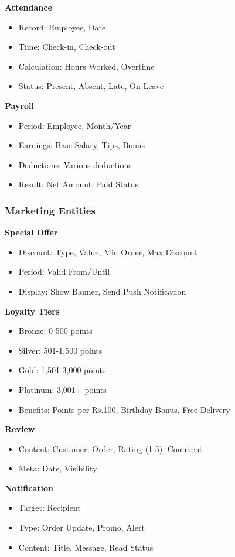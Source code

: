 \documentclass[12pt,a4paper]{article}
\begin{document}
\textbf{Attendance}
\begin{itemize}
    \item Record: Employee, Date
    \item Time: Check-in, Check-out
    \item Calculation: Hours Worked, Overtime
    \item Status: Present, Absent, Late, On Leave
\end{itemize}

\textbf{Payroll}
\begin{itemize}
    \item Period: Employee, Month/Year
    \item Earnings: Base Salary, Tips, Bonus
    \item Deductions: Various deductions
    \item Result: Net Amount, Paid Status
\end{itemize}

\subsubsection{Marketing Entities}

\textbf{Special Offer}
\begin{itemize}
    \item Discount: Type, Value, Min Order, Max Discount
    \item Period: Valid From/Until
    \item Display: Show Banner, Send Push Notification
\end{itemize}

\textbf{Loyalty Tiers}
\begin{itemize}
    \item Bronze: 0-500 points
    \item Silver: 501-1,500 points
    \item Gold: 1,501-3,000 points
    \item Platinum: 3,001+ points
    \item Benefits: Points per Rs.100, Birthday Bonus, Free Delivery
\end{itemize}

\textbf{Review}
\begin{itemize}
    \item Content: Customer, Order, Rating (1-5), Comment
    \item Meta: Date, Visibility
\end{itemize}

\textbf{Notification}
\begin{itemize}
    \item Target: Recipient
    \item Type: Order Update, Promo, Alert
    \item Content: Title, Message, Read Status
\end{itemize}
\end{document}
